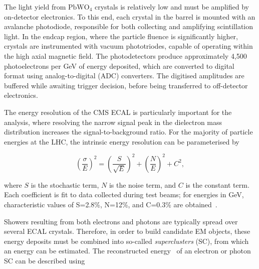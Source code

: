 The light yield from $\mathrm{PbWO}_{4}$ crystals is relatively low and must be amplified by on-detector electronics. To this end, each crystal in the barrel is mounted with an avalanche photodiode, responsible for both collecting and amplifying scintillation light. In the endcap region, where the particle fluence is significantly higher, crystals are instrumented with vacuum phototriodes, capable of operating within the high axial magnetic field. The photodetectors produce approximately 4,500 photoelectrons per GeV of energy deposited, which are converted to digital format using analog-to-digital (ADC) converters. The digitised amplitudes are buffered while awaiting trigger decision, before being transferred to off-detector electronics.

The energy resolution of the CMS ECAL is particularly important for the \Hee analysis, where resolving the narrow signal peak in the dielectron mass distribution increases the signal-to-background ratio. For the majority of particle energies at the LHC, the intrinsic energy resolution can be parameterised by

\begin{equation}
    \left( \frac{\sigma}{E} \right)^2 =  \left( \frac{S}{\sqrt{E}} \right)^2 + \left( \frac{N}{E} \right)^2 + C^{2},
\end{equation}

\noindent where $S$ is the stochastic term, $N$ is the noise term, and $C$ is the constant term.
Each coefficient is fit to data collected during test beams; for energies in GeV, characteristic values of S=2.8\%, N=12\%, and C=0.3\% are obtained~\cite{CMS}. 


Showers resulting from both electrons and photons are typically spread over several ECAL crystals. Therefore, in order to build candidate EM objects, these energy deposits must be combined into so-called \textit{superclusters} (SC), from which an energy can be estimated. The reconstructed energy~\cite{CMS_ECAL_extra_info} of an electron or photon SC can be described using

